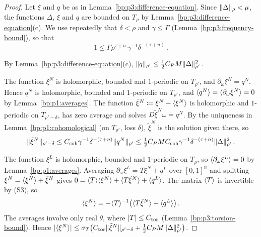\begin{proof}
Let $\xi$ and $q$ be as in Lemma~\ref{bp:p3:difference-equation}. Since $\lVert \Delta\rVert_\rho<\mu$, the
functions $\Delta$, $\xi$ and $q$ are bounded on $T_\rho$ by Lemma~\ref{bp:p3:difference-equation}(c). We use repeatedly that $\delta<\rho$
and $\gamma\le\Gamma$ (Lemma~\ref{bp:p3:frequency-bound}), so that
\begin{equation}\label{eq:p3:absorb}
1\le\Gamma\rho^{\tau+n}\,\gamma^{-1}\delta^{-(\tau+n)}\,.
\end{equation}

\label{step:p3:quad-remainder}
By Lemma~\ref{bp:p3:difference-equation}(c), $\lVert q\rVert_{\rho'}\le\frac12C_PM\lVert \Delta\rVert_{\rho'}^2$.

\label{step:p3:quad-normal-osc}
The function $\xi^N$ is holomorphic, bounded and $1$-periodic on $T_{\rho'}$, and
$\partial_\omega\xi^N=q^N$. Hence $q^N$ is holomorphic, bounded and $1$-periodic on $T_{\rho'}$, and
$\langle q^N\rangle=\langle \partial_\omega\xi^N\rangle=0$ by Lemma~\ref{bp:p1:averages}. The function $\tilde\xi^N\coloneqq\xi^N-\langle \xi^N\rangle$ is holomorphic and
$1$-periodic on $T_{\rho'-\delta}$, has zero average and solves $D\tilde\xi^N\omega=q^N$. By the
uniqueness in Lemma~\ref{bp:p1:cohomological} (on $T_{\rho'}$, loss $\delta$), $\tilde\xi^N$ is the
solution given there, so
\begin{equation*}
\lVert \tilde\xi^N\rVert_{\rho'-\delta}\le C_{\mathrm{coh}}\gamma^{-1}\delta^{-(\tau+n)}\lVert q^N\rVert_{\rho'}
\le\tfrac12C_PMC_{\mathrm{coh}}\gamma^{-1}\delta^{-(\tau+n)}\lVert \Delta\rVert_{\rho'}^2\,.
\end{equation*}

\label{step:p3:quad-normal-avg}
The function $\xi^L$ is holomorphic, bounded and $1$-periodic on $T_\rho$, so
$\langle \partial_\omega\xi^L\rangle=0$ by Lemma~\ref{bp:p1:averages}. Averaging
$\partial_\omega\xi^L=T\xi^N+q^L$ over $[0,1]^n$ and splitting $\xi^N=\langle \xi^N\rangle+\tilde\xi^N$ gives
$0=\langle T\rangle\langle \xi^N\rangle+\langle T\tilde\xi^N\rangle+\langle q^L\rangle$. The matrix $\langle T\rangle$ is invertible by (S3), so
\begin{equation*}
\langle \xi^N\rangle=-\langle T\rangle^{-1}\bigl(\langle T\tilde\xi^N\rangle+\langle q^L\rangle\bigr)\,.
\end{equation*}
The averages involve only real $\theta$, where $\lvert T\rvert\le C_{\mathrm{tor}}$
(Lemma~\ref{bp:p3:torsion-bound}). Hence
$\lvert \langle \xi^N\rangle\rvert\le\sigma_T\bigl(C_{\mathrm{tor}}\lVert \tilde\xi^N\rVert_{\rho'-\delta}
+\frac12C_PM\lVert \Delta\rVert_{\rho'}^2\bigr)$.


\end{proof}
